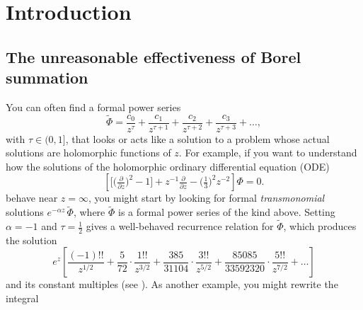 \documentclass{article}
\theoremstyle{definition}
\newcommand{\series}[1]{\tilde{#1}}
\theoremstyle{plain}
\begin{document}
\section{Introduction}
\subsection{The unreasonable effectiveness of Borel summation}\label{intro:summation}
You can often find a formal power series %
\[ \series{\Phi} = \frac{c_0}{z^\tau} + \frac{c_1}{z^{\tau+1}} + \frac{c_2}{z^{\tau+2}} + \frac{c_3}{z^{\tau+3}} + \ldots, \]
with $\tau \in (0, 1]$, that looks or acts like a solution to a problem whose actual solutions are holomorphic functions of $z$. For example, if you want to understand how the solutions of the holomorphic ordinary differential equation (ODE)
\begin{equation}
\left[ \big[ \big(\tfrac{\partial}{\partial z}\big)^2 - 1 \big] + z^{-1} \tfrac{\partial}{\partial z} - \big(\tfrac{1}{3}\big)^2 z^{-2} \right] \Phi= 0. \label{eqn:bessel-rescaled-1}
\end{equation}
behave near $z = \infty$, you might start by looking for formal {\em transmonomial} solutions $e^{-\alpha z}\,\series{\Phi}$, where $\series{\Phi}$ is a formal power series of the kind above. Setting $\alpha = -1$ and $\tau = \tfrac{1}{2}$ gives a well-behaved recurrence relation for $\series{\Phi}$, which produces the solution 
\begin{equation}
e^{z} \left[ \frac{(-1)!!}{z^{1/2}} + \frac{5}{72} \cdot \frac{1!!}{z^{3/2}} + \frac{385}{31104} \cdot \frac{3!!}{z^{5/2}} + \frac{85085}{33592320} \cdot \frac{5!!}{z^{7/2}} + \ldots \right] \label{series:bessel-ex}
\end{equation}
and its constant multiples (see \cite[equation 10.40.1]{dlmf}). As another example, you might rewrite the integral
\end{document}
